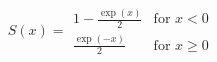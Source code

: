 

\[
S(x) = \begin{array}{ll} 1 - \frac{\exp{(x)}} {2} & \mbox{for $x < 0$} \\ \frac{\exp{(-x)}} {2} & \mbox{for $x \ge 0$} \end{array}
\]



